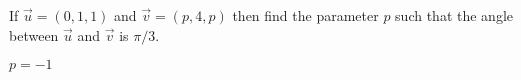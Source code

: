 
\begin{Exercise}[
name={},
title={}, 
difficulty=0,
origin={\cite{BS}}]
If $\vec{u}=(0, 1, 1)$ and $\vec{v}=(p, 4, p)$ then find the parameter $p$ such that the angle between $\vec{u}$ and $\vec{v}$ is $\pi/3$.
\end{Exercise}

\begin{Answer}
$p=-1$
\end{Answer}
